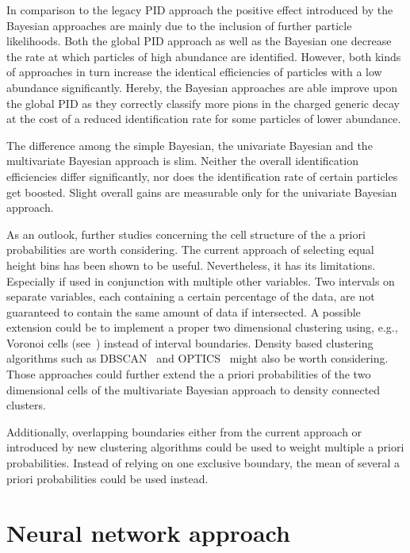 In comparison to the legacy PID approach the positive effect introduced by the Bayesian approaches are mainly due to the inclusion of further particle likelihoods. Both the global PID approach as well as the Bayesian one decrease the rate at which particles of high abundance are identified. However, both kinds of approaches in turn increase the identical efficiencies of particles with a low abundance significantly. Hereby, the Bayesian approaches are able improve upon the global PID as they correctly classify more pions in the charged generic decay at the cost of a reduced identification rate for some particles of lower abundance.

The difference among the simple Bayesian, the univariate Bayesian and the multivariate Bayesian approach is slim. Neither the overall identification efficiencies differ significantly, nor does the identification rate of certain particles get boosted. Slight overall gains are measurable only for the univariate Bayesian approach.

As an outlook, further studies concerning the cell structure of the a priori probabilities are worth considering. The current approach of selecting equal height bins has been shown to be useful. Nevertheless, it has its limitations. Especially if used in conjunction with multiple other variables. Two intervals on separate variables, each containing a certain percentage of the data, are not guaranteed to contain the same amount of data if intersected. A possible extension could be to implement a proper two dimensional clustering using, e.g., Voronoi cells (see~\cite{KnowledgeDiscoveryInDatabases1:Clustering}) instead of interval boundaries. Density based clustering algorithms such as DBSCAN~\cite{KnowledgeDiscoveryInDatabases1:Clustering} and OPTICS~\cite{KnowledgeDiscoveryInDatabases1:Clustering} might also be worth considering. Those approaches could further extend the a priori probabilities of the two dimensional cells of the multivariate Bayesian approach to density connected clusters.

Additionally, overlapping boundaries either from the current approach or introduced by new clustering algorithms could be used to weight multiple a priori probabilities. Instead of relying on one exclusive boundary, the mean of several a priori probabilities could be used instead.

\section{Neural network approach}
\label{sec:neural_network_approach}

